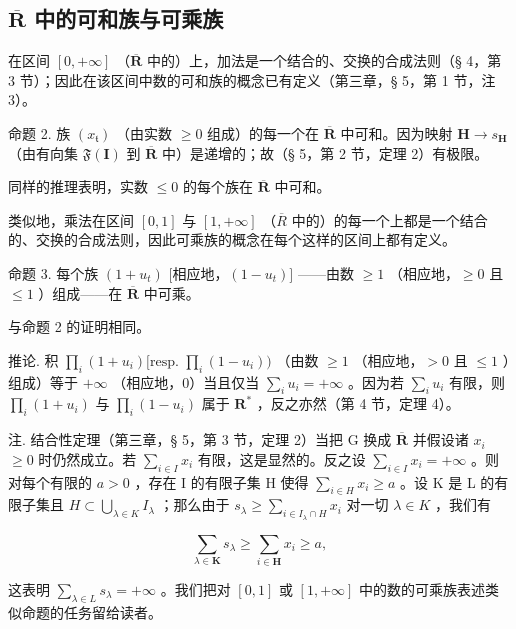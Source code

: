 \subsection{\texorpdfstring{\(\overline{\mathbf{R}}\) 中的可和族与可乘族}{SUMMABLE FAMILIES AND MULTIPLIABLE FAMILIES IN \textbackslash overline\{\textbackslash mathbf\{R\}\}}}

在区间 \([0, +\infty]\) （\(\overline{\mathbf{R}}\) 中的）上，加法是一个结合的、交换的合成法则（§ 4，第 3 节）；因此在该区间中数的可和族的概念已有定义（第三章，§ 5，第 1 节，注 3）。

命题 2. 族 \((x_{\mathfrak{t}})\) （由实数 \(\geqslant 0\) 组成）的每一个在 \(\overline{\mathbf{R}}\) 中可和。因为映射 \(\mathbf{H} \to s_{\mathbf{H}}\) （由有向集 \(\mathfrak{F}(\mathbf{I})\) 到 \(\overline{\mathbf{R}}\) 中）是递增的；故（§ 5，第 2 节，定理 2）有极限。

同样的推理表明，实数 \(\leqslant 0\) 的每个族在 \(\overline{\mathbf{R}}\) 中可和。

类似地，乘法在区间 \([0, 1]\) 与 \([1, +\infty]\) （\(\overline{R}\) 中的）的每一个上都是一个结合的、交换的合成法则，因此可乘族的概念在每个这样的区间上都有定义。

命题 3. 每个族 \((1 + u_{t})\) {[}相应地，\((1 - u_{t})]\) ——由数 \(\geqslant 1\) （相应地，\(\geqslant 0\) 且 \(\leqslant 1\) ）组成——在 \(\overline{\mathbf{R}}\) 中可乘。

与命题 2 的证明相同。

推论. 积 \(\prod_{i} (1 + u_i) [\text{resp. } \prod_{i} (1 - u_i))\) （由数 \(\geqslant 1\) （相应地，\(>0\) 且 \(\leqslant 1\) ）组成）等于 \(+\infty\) （相应地，0）当且仅当 \(\sum_{i} u_i = +\infty\) 。因为若 \(\sum_{i} u_i\) 有限，则 \(\prod_{i} (1 + u_i)\) 与 \(\prod_{i} (1 - u_i)\) 属于 \(\mathbf{R}^*\) ，反之亦然（第 4 节，定理 4）。

注. 结合性定理（第三章，§ 5，第 3 节，定理 2）当把 G 换成 \(\overline{\mathbf{R}}\) 并假设诸 \(x_{i}\) \(\geqslant 0\) 时仍然成立。若 \(\sum_{i \in I} x_{i}\) 有限，这是显然的。反之设 \(\sum_{i \in I} x_{i} = +\infty\) 。则对每个有限的 \(a > 0\) ，存在 I 的有限子集 H 使得 \(\sum_{i \in H} x_{i} \geqslant a\) 。设 K 是 L 的有限子集且 \(H \subset \bigcup_{\lambda \in K} I_{\lambda}\) ；那么由于 \(s_{\lambda} \geqslant \sum_{i \in I_{\lambda} \cap H} x_{i}\) 对一切 \(\lambda \in K\) ，我们有

\[
\sum_ {\lambda \in \mathbf {K}} s _ {\lambda} \geqslant \sum_ {i \in \mathbf {H}} x _ {i} \geqslant a,
\]

这表明 \(\sum_{\lambda \in L} s_{\lambda} = +\infty\) 。我们把对 \([0, 1]\) 或 \([1, +\infty]\) 中的数的可乘族表述类似命题的任务留给读者。

